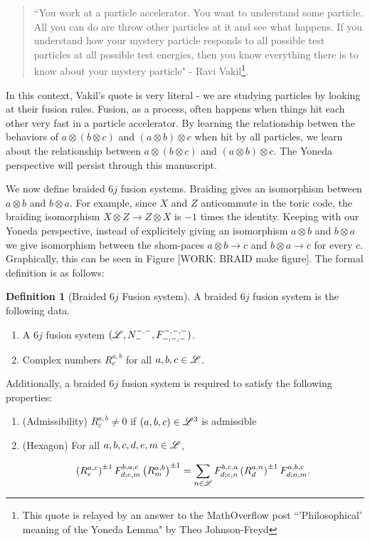 \documentclass{article}
\theoremstyle{definition}
\newtheorem*{definition}{Definition}
\numberwithin{figure}{section}
\begin{document}
\begin{quote}
``You work at a particle accelerator. You want to understand some particle. All you can do are throw other particles at it and see what happens. If you understand how your mystery particle responds to all possible test particles at all possible test energies, then you know everything there is to know about your mystery particle" - Ravi Vakil\footnote{This quote is relayed by an answer to the MathOverflow post ``'Philosophical' meaning of the Yoneda Lemma" by Theo Johnson-Freyd}.
\end{quote}

In this context, Vakil's quote is very literal - we are studying particles by looking at their fusion rules. Fusion, as a process, often happens when things hit each other very fast in a particle accelerator. By learning the relationship betwen the behaviors of $a\otimes (b\otimes c)$ and $(a\otimes b)\otimes c$ when hit by all particles, we learn about the relationship between $a\otimes (b\otimes c)$ and $(a\otimes b)\otimes c$. The Yoneda perspective will persist through this manuscript.

We now define braided $6j$ fusion systems. Braiding gives an isomorphism between $a\otimes b$ and $b\otimes a$. For example, since $X$ and $Z$ anticommute in the toric code, the braiding isomorphism $X\otimes Z\to Z\otimes X$ is $-1$ times the identity. Keeping with our Yoneda perspective, instead of explicitely giving an isomorphism $a\otimes b$ and $b\otimes a$ we give isomorphism between the shom-paces $a\otimes b\to c$ and $b\otimes a\to c$ for every $c$. Graphically, this can be seen in Figure [WORK: BRAID make figure]. The formal definition is as follows:

\begin{definition}[Braided $6j$ Fusion system] A braided $6j$ fusion system is the following data.

\begin{enumerate}
\item A $6j$ fusion system $(\mathscr{L}, N_{\--}^{\--,\--},F^{\--,\--,\--}_{\--;\--,\--})$.
\item Complex numbers $R^{a,b}_{c}$ for all $a,b,c\in \mathscr{L}$.
\end{enumerate}

Additionally, a braided $6j$ fusion system is required to satisfy the following properties:

\begin{enumerate}

\item (Admissibility) $R^{a,b}_{c}\neq 0$ if $(a,b,c)\in \mathscr{L}^3$ is admissible

\item (Hexagon) For all $a,b,c,d,e,m\in\mathscr{L}$,

$$\left(R^{a,c}_{e}\right)^{\pm 1}F^{b,a,c}_{d;e,m}\left(R^{a,b}_{m}\right)^{\pm 1}=\sum_{n\in \mathscr{L}} F^{b,c,a}_{d;e,n}\left(R^{a,n}_{d}\right)^{\pm 1}F^{a,b,c}_{d;n,m}.$$
\end{enumerate}
\raggedleft\qedsymbol{}
\end{definition}
\end{document}
